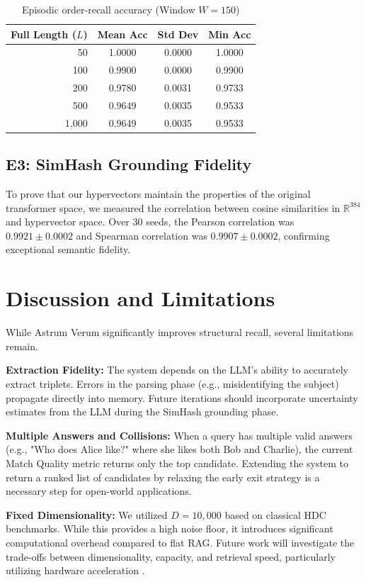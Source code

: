 \documentclass[11pt,letterpaper]{article}
\begin{document}
\begin{table}[h]
\centering
\caption{Episodic order-recall accuracy (Window $W=150$)}
\label{tab:episode}
\begin{tabular}{rccc}
\toprule
Full Length ($L$) & Mean Acc & Std Dev & Min Acc \\
\midrule
50 & 1.0000 & 0.0000 & 1.0000 \\
100 & 0.9900 & 0.0000 & 0.9900 \\
200 & 0.9780 & 0.0031 & 0.9733 \\
500 & 0.9649 & 0.0035 & 0.9533 \\
1,000 & 0.9649 & 0.0035 & 0.9533 \\
\bottomrule
\end{tabular}
\end{table}

\subsection{E3: SimHash Grounding Fidelity}
To prove that our hypervectors maintain the properties of the original transformer space, we measured the correlation between cosine similarities in $\mathbb{R}^{384}$ and hypervector space. Over 30 seeds, the Pearson correlation was $0.9921 \pm 0.0002$ and Spearman correlation was $0.9907 \pm 0.0002$, confirming exceptional semantic fidelity.

\section{Discussion and Limitations}
\label{sec:discussion}

While Astrum Verum significantly improves structural recall, several limitations remain. 

\textbf{Extraction Fidelity:} The system depends on the LLM's ability to accurately extract triplets. Errors in the parsing phase (e.g., misidentifying the subject) propagate directly into memory. Future iterations should incorporate uncertainty estimates from the LLM during the SimHash grounding phase.

\textbf{Multiple Answers and Collisions:} When a query has multiple valid answers (e.g., "Who does Alice like?" where she likes both Bob and Charlie), the current Match Quality metric returns only the top candidate. Extending the system to return a ranked list of candidates by relaxing the early exit strategy is a necessary step for open-world applications.

\textbf{Fixed Dimensionality:} We utilized $D=10,000$ based on classical HDC benchmarks. While this provides a high noise floor, it introduces significant computational overhead compared to flat RAG. Future work will investigate the trade-offs between dimensionality, capacity, and retrieval speed, particularly utilizing hardware acceleration \cite{kleyko2022vector}.
\end{document}
